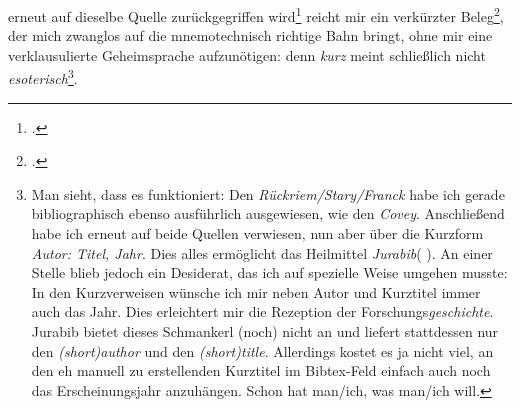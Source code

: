 erneut auf dieselbe Quelle zurückgegriffen wird\footcite[vgl.
dazu][194]{RueStaFra1980a} reicht mir ein verkürzter Beleg\footcite[wie z.B.
jetzt wieder bei][]{Covey2006a}, der mich zwanglos auf die mnemotechnisch
richtige Bahn bringt, ohne mir eine verklausulierte Geheimsprache aufzunötigen:
denn \emph{kurz} meint schließlich nicht \emph{esoterisch}\footnote{Man sieht,
dass es funktioniert: Den \emph{R\"uckriem/Stary/Franck} habe ich gerade
bibliographisch ebenso ausführlich ausgewiesen, wie den \emph{Covey}.
Anschließend habe ich erneut auf beide Quellen verwiesen, nun aber über die
Kurzform \emph{Autor: Titel, Jahr}. Dies alles ermöglicht das Heilmittel
\emph{Jurabib}( \cite[vgl. dazu][]{Berger2004a}). An einer Stelle blieb jedoch
ein Desiderat, das ich auf spezielle Weise umgehen musste: In den Kurzverweisen
wünsche ich mir neben Autor und Kurztitel immer auch das Jahr. Dies erleichtert
mir die Rezeption der Forschungs\emph{geschichte}. Jurabib bietet dieses
Schmankerl (noch) nicht an und liefert stattdessen nur den \emph{(short)author}
und den \emph{(short)title}. Allerdings kostet es ja nicht viel, an den eh
manuell zu erstellenden Kurztitel im Bibtex-Feld einfach auch noch das
Erscheinungsjahr anzuhängen. Schon hat man/ich, was man/ich will.}.

